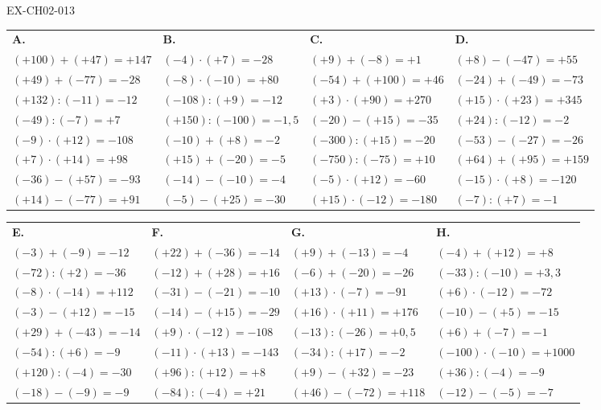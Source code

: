 \begin{solution}{EX-CH02-013}

\def\arraystretch{1.7}
\begin{tabularx}{\linewidth}{*{4}{X}}
\textbf{A.} & \textbf{B.} & \textbf{C.} & \textbf{D.} \\
$(+100)+(+47)=+147$ & $(-4)\cdot(+7)=-28$    & $(+9)+(-8)=+1$       & $(+8)-(-47)=+55$      \\
$(+49)+(-77)=-28$   & $(-8)\cdot(-10)=+80$   & $(-54)+(+100)=+46$   & $(-24)+(-49)=-73$     \\
$(+132):(-11)=-12$  & $(-108):(+9)=-12$      & $(+3)\cdot(+90)=+270$& $(+15)\cdot(+23)=+345$\\
$(-49):(-7)=+7$     & $(+150):(-100)=-1{,}5$ & $(-20)-(+15)=-35$    & $(+24):(-12)=-2$      \\
$(-9)\cdot(+12)=-108$ & $(-10)+(+8)=-2$      & $(-300):(+15)=-20$   & $(-53)-(-27)=-26$     \\
$(+7)\cdot(+14)=+98$& $(+15)+(-20)=-5$       & $(-750):(-75)=+10$   & $(+64)+(+95)=+159$    \\
$(-36)-(+57)=-93$   & $(-14)-(-10)=-4$       & $(-5)\cdot(+12)=-60$ & $(-15)\cdot(+8)=-120$ \\
$(+14)-(-77)=+91$   & $(-5)-(+25)=-30$       & $(+15)\cdot(-12)=-180$& $(-7):(+7)=-1$       \\
\end{tabularx}

\bigskip
\begin{tabularx}{\linewidth}{*{4}{X}}
\textbf{E.} & \textbf{F.} & \textbf{G.} & \textbf{H.} \\
$(-3)+(-9)=-12$      & $(+22)+(-36)=-14$     & $(+9)+(-13)=-4$      & $(-4)+(+12)=+8$       \\
$(-72):(+2)=-36$     & $(-12)+(+28)=+16$     & $(-6)+(-20)=-26$     & $(-33):(-10)=+3{,}3$  \\
$(-8)\cdot(-14)=+112$& $(-31)-(-21)=-10$     & $(+13)\cdot(-7)=-91$ & $(+6)\cdot(-12)=-72$  \\
$(-3)-(+12)=-15$     & $(-14)-(+15)=-29$     & $(+16)\cdot(+11)=+176$& $(-10)-(+5)=-15$     \\
$(+29)+(-43)=-14$    & $(+9)\cdot(-12)=-108$ & $(-13):(-26)=+0{,}5$ & $(+6)+(-7)=-1$        \\
$(-54):(+6)=-9$      & $(-11)\cdot(+13)=-143$& $(-34):(+17)=-2$     & $(-100)\cdot(-10)=+1000$ \\
$(+120):(-4)=-30$    & $(+96):(+12)=+8$      & $(+9)-(+32)=-23$     & $(+36):(-4)=-9$       \\
$(-18)-(-9)=-9$      & $(-84):(-4)=+21$      & $(+46)-(-72)=+118$   & $(-12)-(-5)=-7$       \\
\end{tabularx}


\end{solution}
